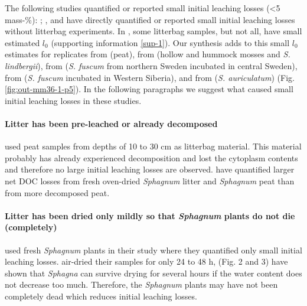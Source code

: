 \documentclass[bg, manuscript]{copernicus}
\begin{document}
The following studies quantified or reported small initial leaching losses (\textless5 mass-\%): \citet{Coulson.1978}; \citet{Thormann.2002}, and \citet{Castells.2005} have directly quantified or reported small initial leaching losses without litterbag experiments. In \citet{Moore.2007}, some litterbag samples, but not all, have small estimated \(l_0\) (supporting information \ref{sup-1}). Our synthesis adds to this small \(l_0\) estimates for replicates from \citet{Prevost.1997} (peat), from \citet{Bartsch.1985} (hollow and hummock mosses and \emph{S. lindbergii}), from \citet{Breeuwer.2008} (\emph{S. fuscum} from northern Sweden incubated in central Sweden), from \citet{Golovatskaya.2017} (\emph{S. fuscum} incubated in Western Siberia), and from \citet{Trinder.2008} (\emph{S. auriculatum}) (Fig. \ref{fig:out-mm36-1-p5}). In the following paragraphs we suggest what caused small initial leaching losses in these studies.

\paragraph*{Litter has been pre-leached or already decomposed}

\citet{Prevost.1997} used peat samples from depths of 10 to 30 cm as litterbag material. This material probably has already experienced decomposition and lost the cytoplasm contents and therefore no large initial leaching losses are observed. \citet{Moore.2001} have quantified larger net DOC losses from fresh oven-dried \emph{Sphagnum} litter and \emph{Sphagnum} peat than from more decomposed peat.

\paragraph*{\texorpdfstring{Litter has been dried only mildly so that \emph{Sphagnum} plants do not die (completely)}{Litter has been dried only mildly so that Sphagnum plants do not die (completely)}}

\citet{Castells.2005} used fresh \emph{Sphagnum} plants in their study where they quantified only small initial leaching losses. \citet{Bartsch.1985} air-dried their samples for only 24 to 48 h, \citet{Schipperges.1998} (Fig. 2 and 3) have shown that \emph{Sphagna} can survive drying for several hours if the water content does not decrease too much. Therefore, the \emph{Sphagnum} plants may have not been completely dead which reduces initial leaching losses.
\end{document}
